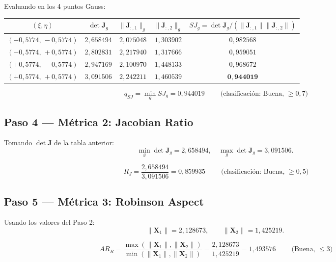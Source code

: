 \documentclass[11pt,a4paper]{article}
\begin{document}
Evaluando en los 4 puntos Gauss:
\begin{center}
\renewcommand{\arraystretch}{1.2}
\begin{tabular}{cccc|c}
\toprule
$(\xi,\eta)$ & $\det\mathbf{J}_g$ & $\|\mathbf{J}_{:,1}\|_g$ & $\|\mathbf{J}_{:,2}\|_g$ & $SJ_g = \det\mathbf{J}_g/(\|\mathbf{J}_{:,1}\|\|\mathbf{J}_{:,2}\|)$ \\
\midrule
$(-0{,}5774,\,-0{,}5774)$ & $2{,}658494$ & $2{,}075048$ & $1{,}303902$ & $0{,}982568$ \\
$(-0{,}5774,\,+0{,}5774)$ & $2{,}802831$ & $2{,}217940$ & $1{,}317666$ & $0{,}959051$ \\
$(+0{,}5774,\,-0{,}5774)$ & $2{,}947169$ & $2{,}100970$ & $1{,}448133$ & $0{,}968672$ \\
$(+0{,}5774,\,+0{,}5774)$ & $3{,}091506$ & $2{,}242211$ & $1{,}460539$ & $\mathbf{0{,}944019}$ \\
\bottomrule
\end{tabular}
\end{center}

\begin{resultbox}[title={M\'etrica 1: Scaled Jacobian Q4}]
\[
\boxed{\;q_{SJ} = \min_g SJ_g = 0{,}944019 \;}\qquad \text{(clasificaci\'on: Buena, $\ge 0{,}7$)}
\]
\end{resultbox}

\subsection{Paso 4 --- M\'etrica 2: Jacobian Ratio}
Tomando $\det\mathbf{J}$ de la tabla anterior:
\[
\min_g \det\mathbf{J}_g = 2{,}658494,\quad \max_g \det\mathbf{J}_g = 3{,}091506.
\]

\begin{resultbox}[title={M\'etrica 2: Jacobian Ratio Q4}]
\[
\boxed{\;R_J = \frac{2{,}658494}{3{,}091506} = 0{,}859935\;}\qquad \text{(clasificaci\'on: Buena, $\ge 0{,}5$)}
\]
\end{resultbox}

\subsection{Paso 5 --- M\'etrica 3: Robinson Aspect}
Usando los valores del Paso 2:
\[
\|\mathbf{X}_1\| = 2{,}128673,\qquad \|\mathbf{X}_2\| = 1{,}425219.
\]

\begin{resultbox}[title={M\'etrica 3: Robinson Aspect Q4}]
\[
\boxed{\;AR_R = \frac{\max(\|\mathbf{X}_1\|,\|\mathbf{X}_2\|)}{\min(\|\mathbf{X}_1\|,\|\mathbf{X}_2\|)} = \frac{2{,}128673}{1{,}425219} = 1{,}493576\;} \qquad \text{(Buena, $\le 3$)}
\]
\end{resultbox}
\end{document}
